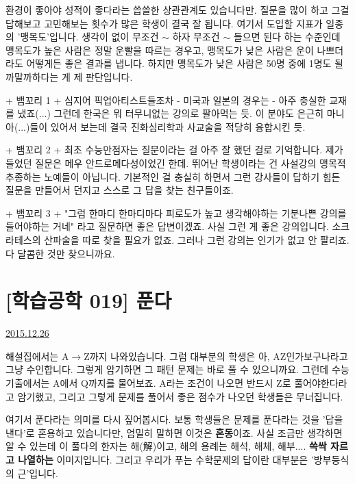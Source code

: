환경이 좋아야 성적이 좋다라는 씁쓸한 상관관계도 있습니다만.
질문을 많이 하고 그걸 답해보고 고민해보는 횟수가 많은 학생이 결국 잘 됩니다.
여기서 도입할 지표가 일종의 '맹목도'입니다.
생각이 없이 무조건 $\sim$ 하자 무조건 $\sim$ 들으면 된다 하는 수준인데
맹목도가 높은 사람은 정말 운빨을 따르는 경우고, 맹목도가 낮은 사람은 운이 나쁘더라도 어떻게든 좋은 결과를 냅니다.
하지만 맹목도가 낮은 사람은 50명 중에 1명도 될까말까하다는 게 제 판단입니다.
\vspace{5mm}

+ 뱀꼬리 1 +
심지어 픽업아티스트들조차 - 미국과 일본의 경우는 - 아주 충실한 교재를 냈죠(...)
그런데 한국은 뭐 터무니없는 강의로 팔아먹는 듯.
이 분야도 은근히 마니아(...)들이 있어서 보는데 결국 진화심리학과 사교술을 적당히 융합시킨 듯.
\vspace{5mm}

+ 뱀꼬리 2 +
최초 수능만점자는 질문이라는 걸 아주 잘 했던 걸로 기억합니다. 제가 들었던 질문은 메우 안드로메다성이었긴 한데.
뛰어난 학생이라는 건 사설강의 맹목적 추종하는 노예들이 아닙니다.
기본적인 걸 충실히 하면서 그런 강사들이 답하기 힘든 질문을 만들어서 던지고 스스로 그 답을 찾는 친구들이죠.
\vspace{5mm}

+ 뱀꼬리 3 +
"그럼 한마디 한마디마다 피로도가 높고 생각해야하는 기분나쁜 강의를 들어야하는 거네"
라고 질문하면 좋은 답변이겠죠. 사실 그런 게 좋은 강의입니다. 소크라테스의 산파술을 따로 찾을 필요가 없죠.
그러나 그런 강의는 인기가 없고 안 팔리죠. 다 달콤한 것만 찾으니까요.
\vspace{5mm}





\section{[학습공학 019] 푼다}
\href{https://www.kockoc.com/Apoc/565246}{2015.12.26}

\vspace{5mm}

해설집에서는 A$\rightarrow$Z까지 나와있습니다.
그럼 대부분의 학생은 아, AZ인가보구나라고 그냥 수인합니다. 그렇게 암기하면 그 패턴 문제는 바로 풀 수 있으니까요.
그런데 수능 기출에서는 A에서 Q까지를 물어보죠.
A라는 조건이 나오면 반드시 Z로 풀어야한다라고 암기했고, 그리고 그렇게 문제를 풀어서 좋은 점수가 나오던 학생들은 무너집니다.
\vspace{5mm}

여기서 푼다라는 의미를 다시 짚어봅시다.
보통 학생들은 문제를 푼다라는 것을 '답을 낸다'로 혼용하고 있습니다만, 엄밀히 말하면 이것은 \textbf{혼동}이죠.
사실 조금만 생각하면 알 수 있는데 이 풀다의 한자는 해(解)이고, 해의 용례는 해석, 해체, 해부....
\textbf{쓱싹 자르고 나열하는} 이미지입니다.
그리고 우리가 푸는 수학문제의 답이란 대부분은 '방부등식의 근'입니다.
\vspace{5mm}

